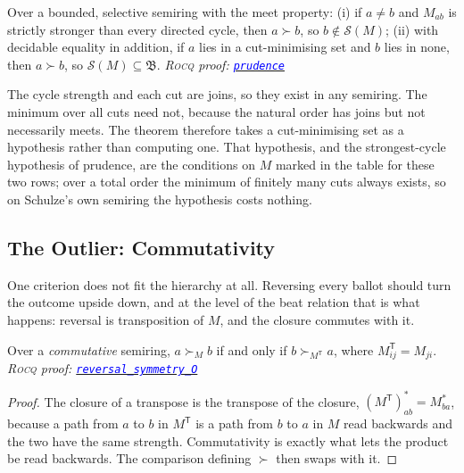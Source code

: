 \documentclass[a4paper,UKenglish,cleveref,autoref,thm-restate,anonymous]{lipics-v2021}
\newcommand{\Mstar}{M^{\ast}}
\newcommand{\rocq}{\textsc{Rocq}}
\newcommand{\anonrepo}{https://anonymous.4open.science/r/Semiring_graph_algorithm-000E}
\newcommand{\rocqfile}[2]{\href{\anonrepo/#1}{\textcolor{blue}{\texttt{#2}}}}
\newcommand{\proofat}[2]{{\footnotesize\itshape\rocq{} proof: \rocqfile{#1}{#2}}}
\begin{document}
\begin{theorem}\label{thm:prudminmax}
Over a bounded, selective semiring with the meet property:
(i) if $a \neq b$ and $M_{ab}$ is strictly stronger than every directed
cycle, then $a \succ b$, so $b \notin \mathcal{S}(M)$;
(ii) with decidable equality in addition, if $a$ lies in a cut-minimising
set and $b$ lies in none, then $a \succ b$, so
$\mathcal{S}(M) \subseteq \mathfrak{B}$.
\proofat{algorithm/PrudenceN.v}{prudence}
\end{theorem}

The cycle strength and each cut are joins, so they exist in any semiring.
The minimum over all cuts need not, because the natural order has joins
but not necessarily meets. The theorem therefore takes a cut-minimising
set as a hypothesis rather than computing one. That hypothesis, and the
strongest-cycle hypothesis of prudence, are the conditions on $M$ marked
in the table for these two rows; over a total order the minimum of
finitely many cuts always exists, so on Schulze's own semiring the
hypothesis costs nothing.



\subsection{The Outlier: Commutativity}\label{sec:outlier}

One criterion does not fit the hierarchy at all. Reversing every ballot
should turn the outcome upside down, and at the level of the beat relation
that is what happens: reversal is transposition of $M$, and the closure
commutes with it.

\begin{theorem}\label{thm:reversal}
Over a \emph{commutative} semiring, $a \succ_M b$ if and only if
$b \succ_{M^{\mathsf{T}}} a$, where $M^{\mathsf{T}}_{ij} = M_{ji}$.
\proofat{algorithm/ReversalsymmetryN.v}{reversal\_symmetry\_O}
\end{theorem}

\begin{proof}
The closure of a transpose is the transpose of the closure,
$(M^{\mathsf{T}})^{\ast}_{ab} = \Mstar_{ba}$, because a path from $a$ to
$b$ in $M^{\mathsf{T}}$ is a path from $b$ to $a$ in $M$ read backwards
and the two have the same strength. Commutativity is exactly what lets the
product be read backwards. The comparison defining $\succ$ then swaps with
it.
\end{proof}
\end{document}
